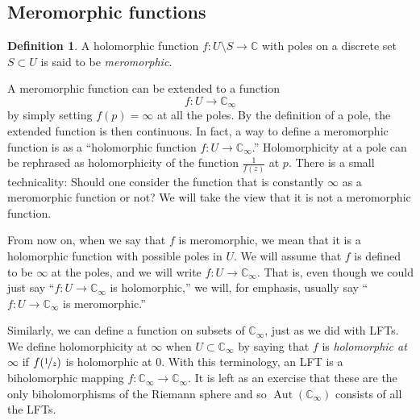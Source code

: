 \documentclass[12pt,openany]{book}
\newcommand{\Aut}{\operatorname{Aut}}
\newcommand{\C}{{\mathbb{C}}}
\newcommand{\myindex}[1]{#1\index{#1}}
\newcommand{\myquote}[1]{``#1''}
\theoremstyle{plain}
\theoremstyle{remark}
\theoremstyle{definition}
\newtheorem{defn}[thm]{Definition}
\theoremstyle{exercise}
\theoremstyle{example}
\begin{document}
\subsection{Meromorphic functions}
\label{subsec:meromorphic}

\begin{defn}
A holomorphic function $f \colon U \setminus S \to \C$ with poles on a
discrete set $S \subset U$ is said to be \emph{\myindex{meromorphic}}.
\end{defn}

A meromorphic function can be extended to a function
\begin{equation*}
f \colon U \to \C_{\infty}
\end{equation*}
by simply setting $f(p) = \infty$ at all the poles.
By the definition of a pole, the extended function is then continuous.
In fact, a way to define
a meromorphic function is as a
\myquote{holomorphic function $f \colon U \to \C_{\infty}$.}
Holomorphicity at a pole can be
rephrased as holomorphicity of the function $\frac{1}{f(z)}$ at $p$.
There is a small technicality: Should one consider the function
that is constantly $\infty$ as a meromorphic function or not?
We will take the view that it is not a meromorphic function.

From now on, when we say that $f$ is
meromorphic, we mean that it is a holomorphic function with possible
poles in $U$.  We will assume that $f$ is defined to be $\infty$
at the poles, and
we will write $f \colon U \to \C_\infty$.  That is, even though we
could just say \myquote{$f \colon U \to \C_\infty$ is holomorphic,} we will, for emphasis,
usually say \myquote{$f \colon U \to \C_\infty$ is meromorphic.}

Similarly, we can define a function on subsets of $\C_\infty$, just as
we did with LFTs.
We define holomorphicity at $\infty$ when $U \subset
\C_\infty$ by saying that $f$ is \emph{\myindex{holomorphic at $\infty$}}
if $f(\nicefrac{1}{z})$ is holomorphic at $0$.
With this terminology, an LFT is a biholomorphic mapping $f \colon
\C_\infty \to \C_\infty$.  It is left as an exercise that
these are the only biholomorphisms of the Riemann sphere and so
$\Aut(\C_\infty)$ consists of all the LFTs.
\end{document}
